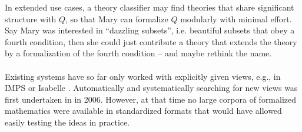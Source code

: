 In extended use cases, a theory classifier may find theories that share significant structure
with $Q$, so that Mary can formalize $Q$ modularly with minimal effort. Say Mary was
interested in ``dazzling subsets'', i.e. beautiful subsets that obey a fourth condition,
then she could just contribute a theory that extends the theory  by a formalization
of the fourth condition -- and maybe rethink the name.
%


\paragraph{}%
Existing systems have so far only worked with explicitly given views, e.g., in IMPS \cite{imps} or Isabelle \cite{isabelle}.
Automatically and systematically searching for new views was first undertaken in \cite{NorKoh:efnrsmk07} in 2006.
However, at that time no large corpora of formalized mathematics were available in standardized formats that would have allowed easily testing the ideas in practice.

